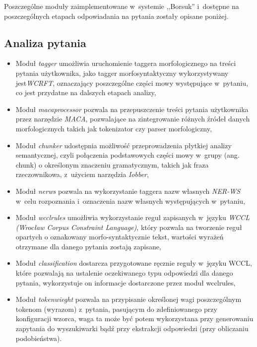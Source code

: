 \documentclass[a4paper, twoside, openright, 12pt]{report}
\begin{document}
        Poszczególne moduły zaimplementowane w~systemie ,,Borsuk'' i~dostępne na poszczególnych etapach odpowiadania na
        pytania zostały opisane poniżej.

        \subsection{Analiza pytania}
            \begin{itemize}
                \item Moduł \emph{tagger} umożliwia uruchomienie taggera morfologicznego na treści pytania użytkownika,
                    jako tagger morfosyntaktyczny wykorzystywany jest\emph{WCRFT}\cite{WCRFT}, oznaczający poszczególne części mowy występujące w~pytaniu,
                    co jest przydatne na dalszych etapach analizy,
                \item Moduł \emph{macaprocessor} pozwala na przepuszczenie treści pytania użytkownika przez narzędzie
                    \emph{MACA}\cite{MACA}, pozwalające na zintegrowanie różnych źródeł danych morfologicznych takich jak tokenizator
                    czy parser morfologiczny,
                \item Moduł \emph{chunker} udostępnia możliwość przeprowadzenia płytkiej analizy semantycznej, czyli połączenia
                    podstawowych części mowy w~grupy (ang. chunk) o określonym znaczeniu gramatycznym, takich jak
                    fraza rzeczownikowa, z~użyciem narzędzia \emph{Iobber},
                \item Moduł \emph{nerws} pozwala na wykorzystanie taggera nazw własnych \emph{NER-WS} w~celu rozpoznania
                    i~oznaczenia nazw własnych występujących w~pytaniu,
                \item Moduł \emph{wcclrules} umożliwia wykorzystanie reguł zapisanych w~języku
                    \emph{WCCL (Wrocław Corpus Constraint Language)}\cite{WCCL}, który pozwala na tworzenie reguł opartych o oznakowany
                    morfo-syntaktycznie tekst, wartości wyrażeń otrzymane dla danego pytania zostają zapisane,
               \item Moduł \emph{classification} dostarcza przygotowane ręcznie reguły w~języku WCCL, które pozwalają
                   na ustalenie oczekiwanego
                   typu odpowiedzi dla danego pytania, wykorzystuje on informacje dostarczone przez moduł wcclrules,
               \item Moduł \emph{tokenwieght} pozwala na przypisanie określonej wagi poszczególnym tokenom (wyrazom) z~pytania,
                   pasującym do zdefiniowanego przy konfiguracji wzorca, waga ta może być potem wykorzystana przy
                   generowaniu zapytania do wyszukiwarki bądź przy ekstrakcji odpowiedzi (przy obliczaniu podobieństwa).
            \end{itemize}
\end{document}
